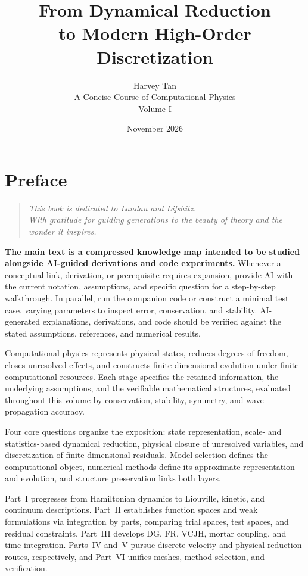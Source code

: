 \documentclass[11pt,openany]{book}
\title{From Dynamical Reduction\\to Modern High-Order Discretization}
\author{Harvey Tan\\[0.6em]\large A Concise Course of Computational Physics\\Volume I}
\date{November 2026}
\begin{document}
\frontmatter
\maketitle
\chapter*{Preface}
\begin{quote}
\itshape
This book is dedicated to Landau and Lifshitz.\\
With gratitude for guiding generations to the beauty of theory and the wonder it inspires.
\end{quote}
\begin{tcolorbox}[colback=red!3,colframe=red!65!black,title={Study Guide: AI Explanations and Code Experiments},fonttitle=\bfseries,boxrule=0.8pt,arc=1mm,breakable]
\textbf{The main text is a compressed knowledge map intended to be studied alongside AI-guided derivations and code experiments.}
Whenever a conceptual link, derivation, or prerequisite requires expansion,
provide AI with the current notation, assumptions, and specific question for a step-by-step walkthrough.
In parallel, run the companion code or construct a minimal test case, varying parameters to inspect error, conservation, and stability.
AI-generated explanations, derivations, and code should be verified against the stated assumptions, references, and numerical results.
\end{tcolorbox}
Computational physics represents physical states, reduces degrees of freedom, closes unresolved effects, and constructs finite-dimensional evolution under finite computational resources. Each stage specifies the retained information, the underlying assumptions, and the verifiable mathematical structures, evaluated throughout this volume by conservation, stability, symmetry, and wave-propagation accuracy.

Four core questions organize the exposition: state representation, scale- and statistics-based dynamical reduction, physical closure of unresolved variables, and discretization of finite-dimensional residuals. Model selection defines the computational object, numerical methods define its approximate representation and evolution, and structure preservation links both layers.

Part~I progresses from Hamiltonian dynamics to Liouville, kinetic, and continuum descriptions. Part~II establishes function spaces and weak formulations via integration by parts, comparing trial spaces, test spaces, and residual constraints. Part~III develops DG, FR, VCJH, mortar coupling, and time integration. Parts~IV and~V pursue discrete-velocity and physical-reduction routes, respectively, and Part~VI unifies meshes, method selection, and verification.
\end{document}

